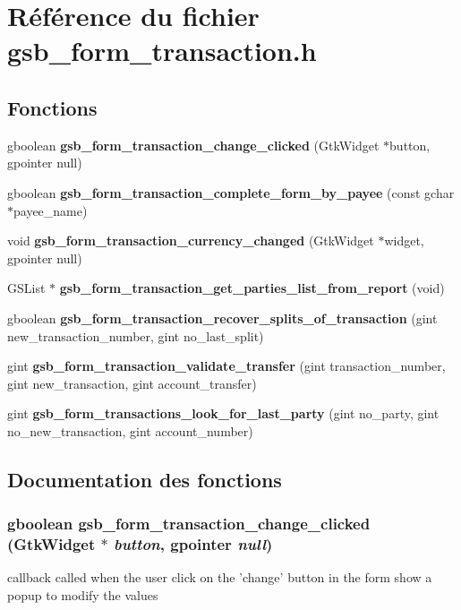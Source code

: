 \section{Référence du fichier gsb\_\-form\_\-transaction.h}
\label{gsb__form__transaction_8h}
\subsection*{Fonctions}
\begin{DoxyCompactItemize}
\item 
gboolean {\bf gsb\_\-form\_\-transaction\_\-change\_\-clicked} (GtkWidget $\ast$button, gpointer null)
\item 
gboolean {\bf gsb\_\-form\_\-transaction\_\-complete\_\-form\_\-by\_\-payee} (const gchar $\ast$payee\_\-name)
\item 
void {\bf gsb\_\-form\_\-transaction\_\-currency\_\-changed} (GtkWidget $\ast$widget, gpointer null)
\item 
GSList $\ast$ {\bf gsb\_\-form\_\-transaction\_\-get\_\-parties\_\-list\_\-from\_\-report} (void)
\item 
gboolean {\bf gsb\_\-form\_\-transaction\_\-recover\_\-splits\_\-of\_\-transaction} (gint new\_\-transaction\_\-number, gint no\_\-last\_\-split)
\item 
gint {\bf gsb\_\-form\_\-transaction\_\-validate\_\-transfer} (gint transaction\_\-number, gint new\_\-transaction, gint account\_\-transfer)
\item 
gint {\bf gsb\_\-form\_\-transactions\_\-look\_\-for\_\-last\_\-party} (gint no\_\-party, gint no\_\-new\_\-transaction, gint account\_\-number)
\end{DoxyCompactItemize}


\subsection{Documentation des fonctions}
\subsubsection[{gsb\_\-form\_\-transaction\_\-change\_\-clicked}]{\setlength{\rightskip}{0pt plus 5cm}gboolean gsb\_\-form\_\-transaction\_\-change\_\-clicked (GtkWidget $\ast$ {\em button}, \/  gpointer {\em null})}\label{gsb__form__transaction_8h_a927a6c6a4223e910e227c7683bd5d841}
callback called when the user click on the 'change' button in the form show a popup to modify the values


